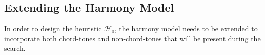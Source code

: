 \documentclass[12pt,a4paper,twoside,openany]{report} \usepackage[pdfborder={0 0 0}]{hyperref}    %
\theoremstyle{definition} \newtheorem{definition}{Definition}[section]
\begin{document}
%
%




  \subsection{Extending the Harmony Model} 
  In order to design the heuristic $\mathcal{H}_0$, the harmony model needs to
  be extended to incorporate both chord-tones and non-chord-tones that will be present during the search.
\end{document}
